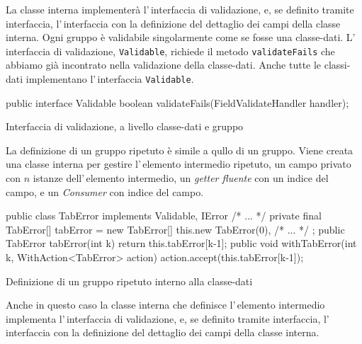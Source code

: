 \documentclass[a4paper,10pt]{report}
\newenvironment{elisting}[1][H]
  {\captionsetup{aboveskip=0pt}\begin{listing}[#1]}
  {\end{listing}%
}
\begin{document}
La classe interna implementerà l'\,interfaccia di validazione, e, se definito
tramite interfaccia, l'\,interfaccia con la definizione del dettaglio dei campi
della classe interna.
Ogni gruppo è validabile singolarmente come se fosse una classe-dati.
L'\,interfaccia di validazione, \texttt{Validable}, richiede il metodo
\texttt{validateFails} che abbiamo già incontrato nella validazione della
classe-dati. Anche tutte le classi-dati implementano l'\,interfaccia 
\texttt{Validable}.

\begin{elisting}[!htb]
\begin{javacode}
public interface Validable {
    boolean validateFails(FieldValidateHandler handler);
}
\end{javacode}
\caption{Interfaccia di validazione, a livello classe-dati e gruppo}
\label{lst:if.validable}
\end{elisting}

La definizione di un gruppo ripetuto è simile a qullo di un gruppo.
Viene creata una classe interna per gestire l'\,elemento 
intermedio ripetuto, un campo privato con $n$ istanze dell'\,elemento 
intermedio, un \textit{getter fluente} con un indice del campo, 
e un \textit{Consumer} con indice del campo.

\begin{elisting}[!htb]
\begin{javacode}
    public class TabError implements Validable, IError {/* ... */}
    private final TabError[] tabError = new TabError[] {
        this.new TabError(0),
        /* ... */
    };
    public TabError tabError(int k) { return this.tabError[k-1]; }
    public void withTabError(int k, WithAction<TabError> action) { action.accept(this.tabError[k-1]); }
\end{javacode}
\caption{Definizione di un gruppo ripetuto interno alla classe-dati}
\label{lst:occ.indef}
\end{elisting}

Anche in questo caso la classe interna che definisce l'\,elemento intermedio 
implementa l'\,interfaccia di validazione, e, se definito tramite interfaccia, 
l'\,interfaccia con la definizione del dettaglio dei campi della classe interna.
\end{document}
